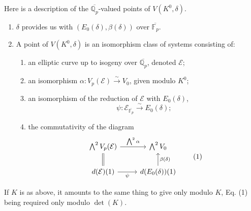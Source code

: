 \documentclass[11pt]{article}
\newcommand{\Fp}{\mathbb{F}_{p}}
\newcommand{\Qp}{\mathbb{Q}_{p}}
\begin{document}
Here is a description of the \(\overline{\Qp}\)-valued points of \(V(K^0,\delta)\).
\begin{enumerate}[label=(\alph*)]
\item \(\delta\) provides us with \((E_0(\delta),\beta(\delta))\) over \(\overline{\Fp}\).
\item A point of \(V(K^0,\delta)\) is an isomorphism class of systems consisting of:
\begin{enumerate}[label=(\arabic*)]
\item an elliptic curve up to isogeny over \(\overline{\Qp}\), denoted \(\mathcal E\);
\item an isomorphism \(\alpha:V_p(\mathcal E)\xrightarrow{\sim}V_0\), given modulo \(K^0\);
\item an isomorphism of the reduction of \(\mathcal E\) with \(E_0(\delta)\),
\[
\psi:\mathcal E_{\overline{\Fp}}\xrightarrow{\sim}E_0(\delta);
\]
\item the commutativity of the diagram
\[
\begin{tikzcd}
\bigwedge^2 V_p(\mathcal E) \arrow[r,"\bigwedge^2\alpha"] \arrow[d,equal] &
\bigwedge^2 V_0\\
d(\mathcal E)(1) \arrow[r,"\psi"'] &
d(E_0(\delta))(1) \arrow[u,"\beta(\delta)"']
\end{tikzcd}
\tag{1}
\]
\end{enumerate}
\end{enumerate}
If \(K\) is as above, it amounts to the same thing to give only modulo \(K\), Eq. (1) being required only modulo \(\det(K)\).
\end{document}

